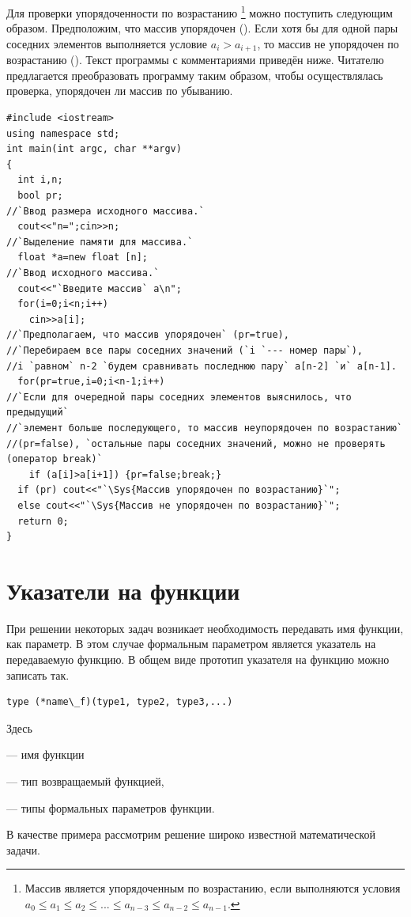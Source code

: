 Для проверки упорядоченности по возрастанию \footnote{Массив является упорядоченным по
возрастанию, если выполняются условия  $a_0\le a_1\le a_2\le ...\le a_{n-3}\le a_{n-2}\le a_{n-1}$.} можно
поступить следующим образом. Предположим, что массив упорядочен (). Если хотя бы для одной
пары соседних элементов выполняется условие $a_i>a_{i+1}$, то массив не упорядочен по возрастанию
(). Текст программы с комментариями приведён ниже. Читателю предлагается преобразовать
программу таким образом, чтобы осуществлялась проверка, упорядочен ли массив по убыванию.
\begin{lstlisting}
#include <iostream>
using namespace std;
int main(int argc, char **argv)
{
  int i,n;
  bool pr;
//`Ввод размера исходного массива.`
  cout<<"n=";cin>>n;
//`Выделение памяти для массива.`
  float *a=new float [n];
//`Ввод исходного массива.`
  cout<<"`Введите массив` a\n";
  for(i=0;i<n;i++)
    cin>>a[i];
//`Предполагаем, что массив упорядочен` (pr=true),
//`Перебираем все пары соседних значений (`i `--- номер пары`),
//i `равном` n-2 `будем сравнивать последнюю пару` a[n-2] `и` a[n-1].
  for(pr=true,i=0;i<n-1;i++)
//`Если для очередной пары соседних элементов выяснилось, что предыдущий` 
//`элемент больше последующего, то массив неупорядочен по возрастанию` 
//(pr=false), `остальные пары соседних значений, можно не проверять (оператор break)`
    if (a[i]>a[i+1]) {pr=false;break;}
  if (pr) cout<<"`\Sys{Массив упорядочен по возрастанию}`";
  else cout<<"`\Sys{Массив не упорядочен по возрастанию}`";
  return 0;
}
\end{lstlisting}

\section[Указатели на функции]{Указатели на функции}
При решении некоторых задач возникает необходимость передавать имя функции, как параметр. В этом случае формальным
параметром является указатель на передаваемую функцию. В общем виде прототип указателя на функцию можно записать так.
\begin{lstlisting}
type (*name\_f)(type1, type2, type3,...)
\end{lstlisting}
Здесь

 --- имя функции

 --- тип возвращаемый функцией, 

 --- типы формальных параметров функции.

В качестве примера рассмотрим решение широко известной математической задачи.

